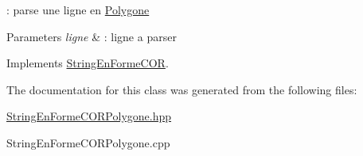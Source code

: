 \+: parse une ligne en \mbox{\hyperlink{class_polygone}{Polygone}} 


\begin{DoxyParams}{Parameters}
{\em ligne} & \+: ligne a parser \\
\hline
\end{DoxyParams}


Implements \mbox{\hyperlink{class_string_en_forme_c_o_r}{String\+En\+Forme\+C\+OR}}.



The documentation for this class was generated from the following files\+:\begin{DoxyCompactItemize}
\item 
\mbox{\hyperlink{_string_en_forme_c_o_r_polygone_8hpp}{String\+En\+Forme\+C\+O\+R\+Polygone.\+hpp}}\item 
String\+En\+Forme\+C\+O\+R\+Polygone.\+cpp\end{DoxyCompactItemize}
